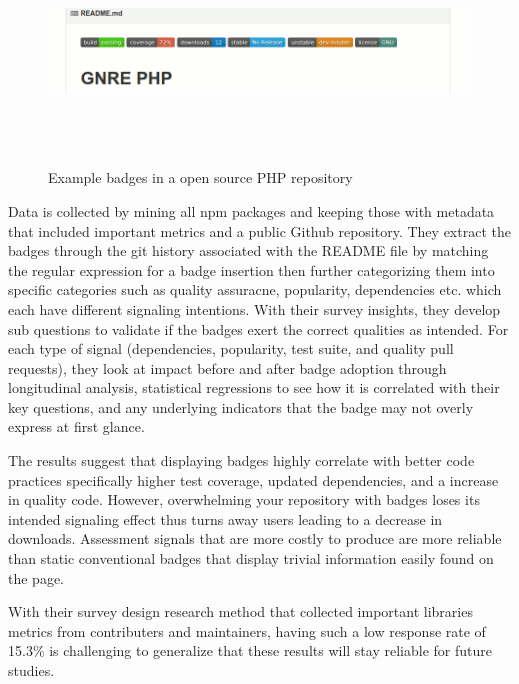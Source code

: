 \documentclass[12pt]{article}
\begin{document}
\begin{figure}
    \centering
    \includegraphics[width=\textwidth,height=6cm,keepaspectratio=true]{gnrephpbadges}
    \caption{
        Example badges in a open source PHP repository \protect\cite{badgeimage}
    }
    \label{phpbadge}
\end{figure}

Data is collected by mining all npm \cite{npm} packages and keeping those with metadata that included 
important metrics and a public Github \cite{github} repository. They extract the badges through the git history associated with 
the README file by matching the regular expression for a badge insertion then further categorizing them into specific categories
such as quality assuracne, popularity, dependencies etc. which each have different signaling intentions.
With their survey insights, they develop sub questions to validate if the badges exert the correct qualities as intended. 
For each type of signal (dependencies, popularity, test suite, and quality pull requests), they look at 
impact before and after badge adoption through longitudinal analysis, statistical regressions
to see how it is correlated with their key questions, and any underlying indicators that the badge may not overly express at first glance.

The results suggest that displaying badges highly correlate with better code practices specifically higher test coverage, updated dependencies, and a increase in quality code.
However, overwhelming your repository with badges loses its intended signaling effect thus turns away users leading to a decrease in downloads.
Assessment signals that are more costly to produce are more reliable than static conventional badges that display trivial information easily found on the page.

With their survey design research method that collected important libraries metrics from contributers and maintainers, having such a low response rate of 15.3\% 
is challenging to generalize that these results will stay reliable for future studies.
\end{document}
